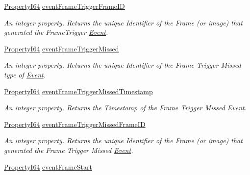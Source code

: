 \begin{DoxyCompactItemize}
\hyperlink{group___common_interface_ga81749b2696755513663492664a18a893}{Property\+I64} \hyperlink{classmv_i_m_p_a_c_t_1_1acquire_1_1_gen_i_cam_1_1_event_control_a9475d07bcbf0b1340f6545aaf34840e0}{event\+Frame\+Trigger\+Frame\+I\+D}
\begin{DoxyCompactList}\small\item\em An integer property. Returns the unique Identifier of the Frame (or image) that generated the Frame\+Trigger \hyperlink{classmv_i_m_p_a_c_t_1_1acquire_1_1_event}{Event}. \end{DoxyCompactList}\item 
\hyperlink{group___common_interface_ga81749b2696755513663492664a18a893}{Property\+I64} \hyperlink{classmv_i_m_p_a_c_t_1_1acquire_1_1_gen_i_cam_1_1_event_control_a2f17f3c4521724cc445820884e74c7d2}{event\+Frame\+Trigger\+Missed}
\begin{DoxyCompactList}\small\item\em An integer property. Returns the unique Identifier of the Frame Trigger Missed type of \hyperlink{classmv_i_m_p_a_c_t_1_1acquire_1_1_event}{Event}. \end{DoxyCompactList}\item 
\hyperlink{group___common_interface_ga81749b2696755513663492664a18a893}{Property\+I64} \hyperlink{classmv_i_m_p_a_c_t_1_1acquire_1_1_gen_i_cam_1_1_event_control_a6e523687fbcfdf67888f8002071aa134}{event\+Frame\+Trigger\+Missed\+Timestamp}
\begin{DoxyCompactList}\small\item\em An integer property. Returns the Timestamp of the Frame Trigger Missed \hyperlink{classmv_i_m_p_a_c_t_1_1acquire_1_1_event}{Event}. \end{DoxyCompactList}\item 
\hyperlink{group___common_interface_ga81749b2696755513663492664a18a893}{Property\+I64} \hyperlink{classmv_i_m_p_a_c_t_1_1acquire_1_1_gen_i_cam_1_1_event_control_a74110a965931172e96039a4b429caa15}{event\+Frame\+Trigger\+Missed\+Frame\+I\+D}
\begin{DoxyCompactList}\small\item\em An integer property. Returns the unique Identifier of the Frame (or image) that generated the Frame Trigger Missed \hyperlink{classmv_i_m_p_a_c_t_1_1acquire_1_1_event}{Event}. \end{DoxyCompactList}\item 
\hyperlink{group___common_interface_ga81749b2696755513663492664a18a893}{Property\+I64} \hyperlink{classmv_i_m_p_a_c_t_1_1acquire_1_1_gen_i_cam_1_1_event_control_a91b1f1f0bd035af41f636fdbc6b3a598}{event\+Frame\+Start}

\end{DoxyCompactItemize}
